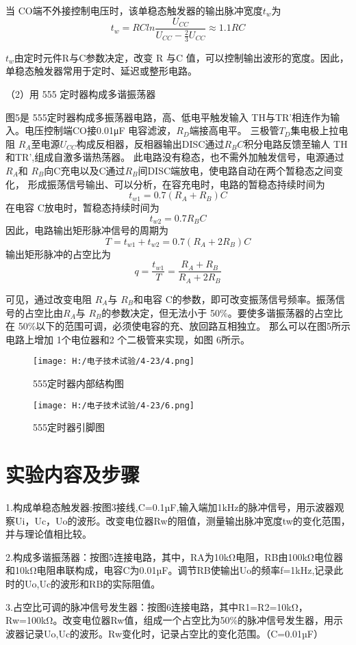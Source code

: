 \documentclass{article}
\begin{document}
当 CO端不外接控制电压时，该单稳态触发器的输出脉冲宽度$ t_w$为
\[   t_w=RCln\frac{U_{CC}}{U_{CC}-\frac{2}{3}U_{CC}}\approx 1.1RC  \]
\par
$t_w$由定时元件R与C参数决定，改变 R 与C 值，可以控制输出波形的宽度。因此，单稳态触发器常用于定时、延迟或整形电路。\par
（2）用 555 定时器构成多谐振荡器\par
图5是 555定时器构成多振荡器电路，高、低电平触发输入 TH与TR'相连作为输入。电压控制端CO接0.01μF 电容滤波，$R_D$端接高电平。
三极管$ T_D$集电极上拉电阻 $R_A$至电源$U_{CC}$构成反相器，反相器输出DISC通过$R_BC$积分电路反馈至输人 TH和TR',组成自激多谐热荡器。
此电路没有稳态，也不需外加触发信号，电源通过$R_A$和 $R_B$向C充电以及C通过$R_B$间DISC端放电，使电路自动在两个暂稳态之间变化，
形成振荡信号输出、可以分析，在容充电时，电路的暂稳态持续时间为
\[ t_{w1}=0.7(R_A+R_B)C\]
在电容 C放电时，暂稳态持续时间为
\[t_{w2}=0.7R_BC\]
因此，电路输出矩形脉冲信号的周期为
\[T=t_{w1}+t_{w2}=0.7(R_A+2R_B)C\]
输出矩形脉冲的占空比为
\[q=\frac{t_{w1}}{T}=\frac{R_A+R_B}{R_A+2R_B}\]

可见，通过改变电阻 $R_A$与 $R_B$和电容 C的参数，即可改变振荡信号频率。振荡信号的占空比由$R_A$与 $R_B$的参数决定，但无法小于 
50\%。要使多谐振荡器的占空比在 50\%以下的范围可调，必须使电容的充、放回路互相独立。
那么可以在图5所示电路上增加 1个电位器和2 个二极管来实现，如图 6所示。

\begin{figure}[h]
    \begin{minipage}[t]{0.5\linewidth} %
      \centering   
      \texttt{[image: H:/电子技术试验/4-23/4.png]}   
      \caption{555定时器内部结构图}   
      \label{fig:side:a}   
    \end{minipage}%
    \begin{minipage}[t]{0.5\linewidth}   
      \centering   
      \texttt{[image: H:/电子技术试验/4-23/6.png]}   
      \caption{555定时器引脚图}   
      \label{fig:side:b}   
    \end{minipage}   
  \end{figure}


\section{ 实验内容及步骤}
1.构成单稳态触发器:按图3接线,C=0.1µF,输入端加1kHz的脉冲信号，用示波器观察Ui，Uc，Uo的波形。改变电位器Rw的阻值，测量输出脉冲宽度tw的变化范围，并与理论值相比较。\par
2.构成多谐振荡器：按图5连接电路，其中，RA为10kΩ电阻，RB由100kΩ电位器和10kΩ电阻串联构成，电容C为0.01µF。调节RB使输出Uo的频率f=1kHz,记录此时的Uo,Uc的波形和RB的实际阻值。\par
3.占空比可调的脉冲信号发生器：按图6连接电路，其中R1=R2=10kΩ，Rw=100kΩ。改变电位器Rw值，组成一个占空比为50\%的脉冲信号发生器，用示波器记录Uo,Uc的波形。Rw变化时，记录占空比的变化范围。（C=0.01µF）\par
\end{document}
